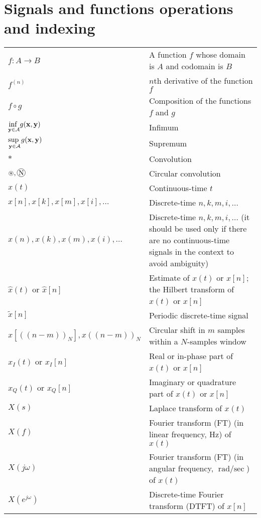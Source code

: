 \documentclass{article}
\newcommand*\circconv[1]{%
\tikz[baseline=(C.base)]\node[draw,circle,inner sep=0.5pt](C) {#1};\!
}
\begin{document}
\section{Signals and functions operations and indexing}
\begin{xltabular}{\textwidth}{XX}
    \(f: A \rightarrow B\)& A function \(f\) whose domain is \(A\) and codomain is \(B\)\\
    \(f^{\left( n \right)}\) & \(n\)th derivative of the function \(f\)\\
    \(f \circ g\) & Composition of the functions \(f\) and \(g\)\\
    \(\underset{\mathbf{y} \in \mathcal{A}}{\textnormal{inf }} g(\mathbf{x},\mathbf{y})\) & Infimum\\
    \(\underset{\mathbf{y} \in \mathcal{A}}{\textnormal{sup }} g(\mathbf{x},\mathbf{y})\) & Supremum\\
    \(*\) & Convolution\\
    \(\circledast, \circconv{N}\) & Circular convolution\\
    \(x(t)\) & Continuous-time \(t\)\\
    \(x[n], x[k], x[m], x[i], \dots\) & Discrete-time \(n, k, m, i, \dots\)\\
    \(x(n), x(k), x(m), x(i), \dots\) & Discrete-time \(n, k, m, i, \dots\) (it should be used only if there are no continuous-time signals in the context to avoid ambiguity)\\
    \(\hat{x}(t)\) or \(\hat{x}[n]\) & Estimate of \(x(t)\) or \(x[n]\); the Hilbert transform of \(x(t)\) or \(x[n]\)\\
    \(\tilde{x}[n]\) & Periodic discrete-time signal\\
    \(x\left[ \left( \left( n - m \right) \right)_N \right], x \left( \left( n - m \right) \right)_N\) & Circular shift in \(m\) samples within a \(N\)-samples window\\
    \(x_I(t)\) or \(x_I[n]\) & Real or in-phase part of \(x(t)\) or \(x[n]\)\\
    \(x_Q(t)\) or \(x_Q[n]\) & Imaginary or quadrature part of \(x(t)\) or \(x[n]\)\\
    \(X(s)\) & Laplace transform of \(x(t)\)\\
    \(X(f)\) & Fourier transform (FT) (in linear frequency, \(\unit{\Hz}\)) of \(x(t)\)\\
    \(X(j\omega)\) & Fourier transform (FT) (in angular frequency, \(\unit{\radian\per\sec}\)) of \(x(t)\)\\
    \(X(e^{j\omega})\) & Discrete-time Fourier transform (DTFT) of \(x[n]\)\\

\end{xltabular}
\end{document}
